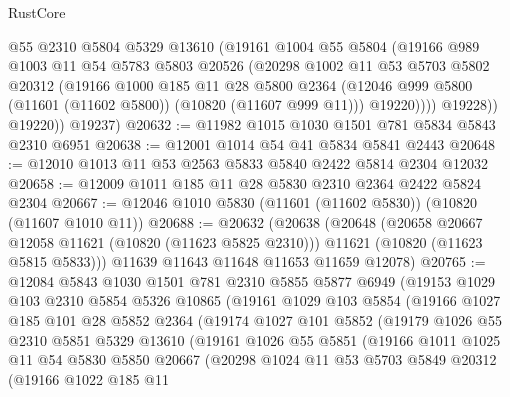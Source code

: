 \begin{lexlean}{RustCore}
\begin{coremodule}
              @55
              @2310
              @5804
              @5329
              @13610
              (@19161
                @1004
                @55
                @5804
                (@19166
                  @989
                  @1003
                  @11
                  @54
                  @5783
                  @5803
                  @20526
                  (@20298
                    @1002
                    @11
                    @53
                    @5703
                    @5802
                    @20312
                    (@19166
                      @1000
                      @185
                      @11
                      @28
                      @5800
                      @2364
                      (@12046 @999 @5800 (@11601 (@11602 @5800)) (@10820 (@11607 @999 @11)))
                      @19220))))
              @19228))
          @19220))
      @19237)
@20632 := @11982 @1015 @1030 @1501 @781 @5834 @5843 @2310 @6951
@20638 := @12001 @1014 @54 @41 @5834 @5841 @2443
@20648 := @12010 @1013 @11 @53 @2563 @5833 @5840 @2422 @5814 @2304 @12032
@20658 := @12009 @1011 @185 @11 @28 @5830 @2310 @2364 @2422 @5824 @2304
@20667 := @12046 @1010 @5830 (@11601 (@11602 @5830)) (@10820 (@11607 @1010 @11))
@20688 := @20632
    (@20638
      (@20648
        (@20658 @20667 @12058 @11621 (@10820 (@11623 @5825 @2310)))
        @11621
        (@10820 (@11623 @5815 @5833)))
      @11639
      @11643
      @11648
      @11653
      @11659
      @12078)
@20765 := @12084
    @5843
    @1030
    @1501
    @781
    @2310
    @5855
    @5877
    @6949
    (@19153
      @1029
      @103
      @2310
      @5854
      @5326
      @10865
      (@19161
        @1029
        @103
        @5854
        (@19166
          @1027
          @185
          @101
          @28
          @5852
          @2364
          (@19174
            @1027
            @101
            @5852
            (@19179
              @1026
              @55
              @2310
              @5851
              @5329
              @13610
              (@19161
                @1026
                @55
                @5851
                (@19166
                  @1011
                  @1025
                  @11
                  @54
                  @5830
                  @5850
                  @20667
                  (@20298
                    @1024
                    @11
                    @53
                    @5703
                    @5849
                    @20312
                    (@19166
                      @1022
                      @185
                      @11

\end{coremodule}
\end{lexlean}
